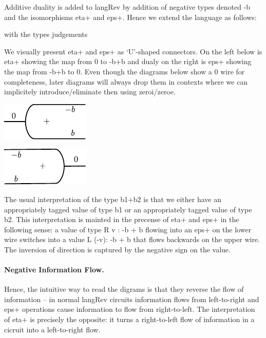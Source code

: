 \documentclass[preprint]{sigplanconf}
\begin{document}
Additive duality is added to {{langRev}} by addition of negative types
denoted {{-b}} and the isomorphisms {{eta+}} and {{eps+}}. Hence we
extend the language as follows:

%

\noindent
with the types judgements



We visually present {{eta+}} and {{eps+}} as `U'-shaped connectors. On
the left below is {{eta+}} showing the map from {{0}} to {{-b+b}} and
dualy on the right is {{eps+}} showing the map from {{-b+b}} to
0. Even though the diagrams below show a {{0}} wire for completeness,
later diagrams will always drop them in contexts where we can
implicitely introduce/eliminate then using {{zeroi}}/{{zeroe}}.

\begin{multicols}{2}
\begin{center}
  \includegraphics{diagrams/eta.pdf}
\end{center}
  
\begin{center}
  \includegraphics{diagrams/eps.pdf}
\end{center}
\end{multicols}

The usual interpretation of the type {{b1+b2}} is that we either have
an appropriately tagged value of type {{b1}} or an appropriately
tagged value of type {{b2}}. This interpretation is mainted in the
precense of {{eta+}} and {{eps+}} in the following sense: a value of
type {{R v : -b + b}} flowing into an {{eps+}} on the lower wire
switches into a value {{L (-v): -b + b}} that flows backwards on the
upper wire. The inversion of direction is captured by the negative
sign on the value.

\paragraph*{Negative Information Flow.} 
Hence, the intuitive way to read the digrams is that they reverse the
flow of information -- in normal {{langRev}} circuits information
flows from left-to-right and {{eps+}} operations cause information to
flow from right-to-left.  The interpretation of {{eta+}} is precisely
the opposite: it turns a right-to-left flow of information in a
cicruit into a left-to-right flow.
\end{document}

